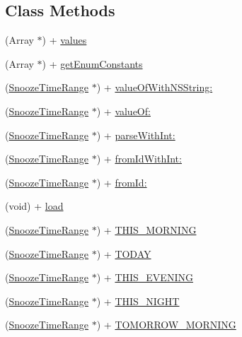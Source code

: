 \subsection*{Class Methods}
\begin{DoxyCompactItemize}
\item 
(Array $\ast$) + \hyperlink{interface_snooze_time_range_ab2de9bf6b7be26ab01bedad06b30ec4e}{values}
\item 
(Array $\ast$) + \hyperlink{interface_snooze_time_range_aa09ebb59721971ab6be0923376344267}{get\+Enum\+Constants}
\item 
(\hyperlink{interface_snooze_time_range}{Snooze\+Time\+Range} $\ast$) + \hyperlink{interface_snooze_time_range_ad1e83c7d07f9e36345117d7d75723fe7}{value\+Of\+With\+N\+S\+String\+:}
\item 
(\hyperlink{interface_snooze_time_range}{Snooze\+Time\+Range} $\ast$) + \hyperlink{interface_snooze_time_range_ab8d02d1a685d2e03af7363043011776c}{value\+Of\+:}
\item 
(\hyperlink{interface_snooze_time_range}{Snooze\+Time\+Range} $\ast$) + \hyperlink{interface_snooze_time_range_a392f2cc7b7a7f76d243a5ec78729595e}{parse\+With\+Int\+:}
\item 
(\hyperlink{interface_snooze_time_range}{Snooze\+Time\+Range} $\ast$) + \hyperlink{interface_snooze_time_range_a04f2b94533e85ef713b631a4ba8ce2e3}{from\+Id\+With\+Int\+:}
\item 
(\hyperlink{interface_snooze_time_range}{Snooze\+Time\+Range} $\ast$) + \hyperlink{interface_snooze_time_range_af5620239d3c918b023ac3085a4f3228c}{from\+Id\+:}
\item 
(void) + \hyperlink{interface_snooze_time_range_a5ce22f7d158b3576b968beffcc78df39}{load}
\item 
(\hyperlink{interface_snooze_time_range}{Snooze\+Time\+Range} $\ast$) + \hyperlink{interface_snooze_time_range_acedba11e1665b72bbadeda781e26e246}{T\+H\+I\+S\+\_\+\+M\+O\+R\+N\+I\+N\+G}
\item 
(\hyperlink{interface_snooze_time_range}{Snooze\+Time\+Range} $\ast$) + \hyperlink{interface_snooze_time_range_afc58f6e7005203b6faf0a45553ec594c}{T\+O\+D\+A\+Y}
\item 
(\hyperlink{interface_snooze_time_range}{Snooze\+Time\+Range} $\ast$) + \hyperlink{interface_snooze_time_range_a8e712da40f90b35c75dca1082415b4a9}{T\+H\+I\+S\+\_\+\+E\+V\+E\+N\+I\+N\+G}
\item 
(\hyperlink{interface_snooze_time_range}{Snooze\+Time\+Range} $\ast$) + \hyperlink{interface_snooze_time_range_a03c13bcb2d80cd650d80f5275685632f}{T\+H\+I\+S\+\_\+\+N\+I\+G\+H\+T}
\item 
(\hyperlink{interface_snooze_time_range}{Snooze\+Time\+Range} $\ast$) + \hyperlink{interface_snooze_time_range_a2eda971a3f482accf66df2ef94dcc428}{T\+O\+M\+O\+R\+R\+O\+W\+\_\+\+M\+O\+R\+N\+I\+N\+G}
\end{DoxyCompactItemize}


